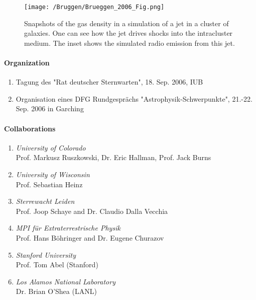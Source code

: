 \begin{figure}[ht]
  \begin{center}
    \texttt{[image: /Bruggen/Brueggen\_2006\_Fig.png]}
    \caption{Snapshots of the gas density in a simulation of a jet in a cluster of
galaxies. One can see how the jet drives shocks into the intracluster
medium. The inset shows the simulated radio emission from this jet.}
    \label{fig:xxx}
  \end{center}
\end{figure}


\paragraph{Organization}

\begin{enumerate}
\item Tagung des "Rat deutscher Sternwarten", 18. Sep. 2006, IUB
\item Organisation eines DFG Rundgespr\"achs "Astrophysik-Schwerpunkte", 21.-22. Sep. 2006 in Garching
\end{enumerate}

\paragraph{Collaborations}
\begin{enumerate}
\item {\sl University of Colorado}\\ Prof. Markusz Ruszkowski,
  Dr. Eric Hallman,  Prof. Jack Burns
\item {\sl University of Wisconsin}\\ Prof. Sebastian Heinz 
\item {\sl Sterrewacht Leiden}\\ Prof. Joop Schaye and Dr. Claudio
  Dalla Vecchia 
\item {\sl MPI f\"ur Extraterrestrische Physik}\\ Prof. Hans
  B\"ohringer and Dr. Eugene Churazov
\item {\sl Stanford University}\\ Prof. Tom Abel (Stanford)
\item {\sl Los Alamos National Laboratory}\\ Dr. Brian O'Shea (LANL)
\end{enumerate}

